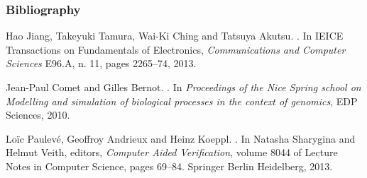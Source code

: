 
\begin{frame}[c]
\frametitle{Bibliography}

\small
\setlength{\parskip}{0.5em}

\tcitebullet Hao Jiang, Takeyuki Tamura, Wai-Ki Ching and Tatsuya Akutsu.
.
In IEICE Transactions on Fundamentals of Electronics, \textit{Communications and Computer Sciences} E96.A, n. 11, pages 2265--74, 2013.

\tcitebullet Jean-Paul Comet and Gilles Bernot.
.
In \textit{Proceedings of the Nice Spring school on Modelling and simulation of biological processes in the context of genomics},
EDP Sciences, 2010.

\tcitebullet Loïc Paulevé, Geoffroy Andrieux and Heinz Koeppl.
.
In Natasha Sharygina and Helmut Veith, editors, \textit{Computer Aided Verification},
volume 8044 of Lecture Notes in Computer Science, pages 69--84.
Springer Berlin Heidelberg, 2013.


\end{frame}



